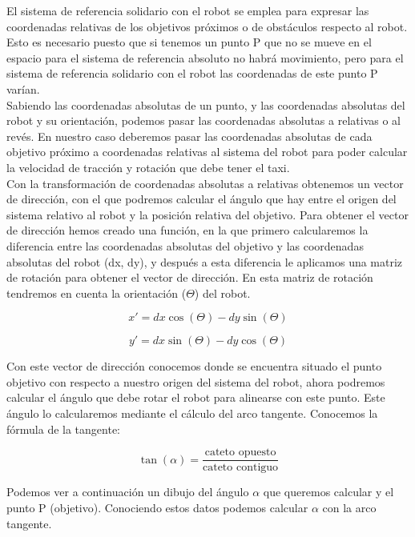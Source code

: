 El sistema de referencia solidario con el robot se emplea para expresar las coordenadas relativas de los objetivos próximos o de obstáculos respecto al robot. Esto es necesario puesto que si tenemos un punto P que no se mueve en el espacio para el sistema de referencia absoluto no habrá movimiento, pero para el sistema de referencia solidario con el robot las coordenadas de este punto P varían.\\

Sabiendo las coordenadas absolutas de un punto, y las coordenadas absolutas del robot y su orientación, podemos pasar las coordenadas absolutas a relativas o al revés. En nuestro caso deberemos pasar las coordenadas absolutas de cada objetivo próximo a coordenadas relativas al sistema del robot para poder calcular la velocidad de tracción y rotación que debe tener el taxi.\\

Con la transformación de coordenadas absolutas a relativas obtenemos un vector de dirección, con el que podremos calcular el ángulo que hay entre el origen del sistema relativo al robot y la posición relativa del objetivo. Para obtener el vector de dirección hemos creado una función, en la que primero calcularemos la diferencia entre las coordenadas absolutas del objetivo y las coordenadas absolutas del robot (dx, dy), y después a esta diferencia le aplicamos una matriz de rotación para obtener el vector de dirección. En esta matriz de rotación tendremos en cuenta la orientación  (\(\Theta\)) del robot.

\begin{equation} 
x' = dx \cos(\Theta) - dy \sin(\Theta)
\end{equation}

\begin{equation} 
y' = dx \sin(\Theta) - dy \cos(\Theta)
\end{equation}


Con este vector de dirección conocemos donde se encuentra situado el punto objetivo con respecto a nuestro origen del sistema del robot, ahora podremos calcular el ángulo que debe rotar el robot para alinearse con este punto. Este ángulo lo calcularemos mediante el cálculo del arco tangente. Conocemos la fórmula de la tangente:

\begin{equation} 
\tan(\alpha) = \frac{\text{cateto opuesto}}{\text{cateto contiguo}}
\end{equation}


Podemos ver a continuación un dibujo del ángulo \(\alpha\) que queremos calcular y el punto P (objetivo). Conociendo estos datos podemos calcular \(\alpha\) con la arco tangente.


